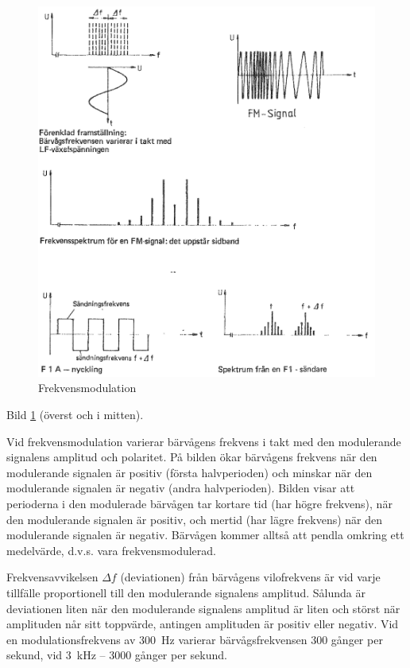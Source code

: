 \begin{figure}
\includegraphics[width=\textwidth]{images/cropped_pdfs/bild_2_1-30.pdf}
\caption{Frekvensmodulation}
\label{fig:BildII1-30}
\end{figure}

Bild \ref{fig:BildII1-30} (överst och i mitten).

Vid frekvensmodulation varierar bärvågens frekvens i takt med den modulerande
signalens amplitud och polaritet. På bilden ökar bärvågens frekvens när den
modulerande signalen är positiv (första halvperioden) och minskar när den
modulerande signalen är negativ (andra halvperioden). Bilden visar att
perioderna i den modulerade bärvågen tar kortare tid (har högre frekvens), när
den modulerande signalen är positiv, och mertid (har lägre frekvens) när den
modulerande signalen är negativ. Bärvågen kommer alltså att pendla omkring ett
medelvärde, d.v.s. vara frekvensmodulerad.

Frekvensavvikelsen \(\Delta f\) (deviationen) från bärvågens vilofrekvens är
vid varje tillfälle proportionell till den modulerande signalens amplitud.
Sålunda är deviationen liten när den modulerande signalens amplitud är liten
och störst när amplituden når sitt toppvärde, antingen amplituden är positiv
eller negativ. Vid en modulationsfrekvens av 300~Hz varierar bärvågsfrekvensen
300 gånger per sekund, vid 3~kHz -- 3000 gånger per sekund.

